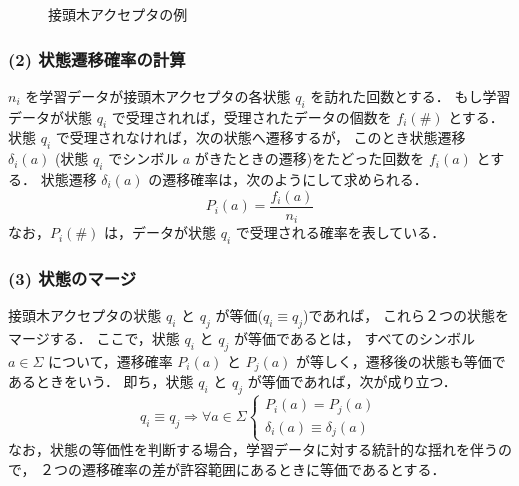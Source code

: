 \begin{figure}[h]
\begin{center}
\end{center}
\caption{接頭木アクセプタの例}
\label{Fig:PTA}
\end{figure}

\subsubsection*{(2) 状態遷移確率の計算}

$n_{i}$ を学習データが接頭木アクセプタの各状態 $q_{i}$ を訪れた回数とする．
もし学習データが状態 $q_{i}$ で受理されれば，受理されたデータの個数を
$f_{i}(\#)$ とする．
状態 $q_{i}$ で受理されなければ，次の状態へ遷移するが，
このとき状態遷移 $\delta_{i}(a)$
(状態 $q_{i}$ でシンボル $a$ がきたときの遷移)をたどった回数を
$f_{i}(a)$ とする．
状態遷移 $\delta_{i}(a)$ の遷移確率は，次のようにして求められる．
\begin{equation}
P_{i}(a) = \frac{f_{i}(a)}{n_{i}}
\end{equation}
なお，$P_{i}(\#)$ は，データが状態 $q_{i}$ で受理される確率を表している．


\subsubsection*{(3) 状態のマージ}

接頭木アクセプタの状態 $q_{i}$ と $q_{j}$ が等価($q_{i} \equiv q_{j}$)であれば，
これら２つの状態をマージする．
ここで，状態 $q_{i}$ と $q_{j}$ が等価であるとは，
すべてのシンボル $a \in \Sigma$ について，遷移確率 $P_{i}(a)$ と
$P_{j}(a)$ が等しく，遷移後の状態も等価であるときをいう．
即ち，状態 $q_{i}$ と $q_{j}$ が等価であれば，次が成り立つ．
\begin{equation}
q_{i} \equiv q_{j} \Longrightarrow
        \forall a \in \Sigma \left \{ \begin{array}{l}
                P_{i}(a) = P_{j}(a) \\
                \delta_{i}(a) \equiv \delta_{j}(a)
        \end{array}
        \right .
\end{equation}
なお，状態の等価性を判断する場合，学習データに対する統計的な揺れを伴うので，
２つの遷移確率の差が許容範囲にあるときに等価であるとする．

